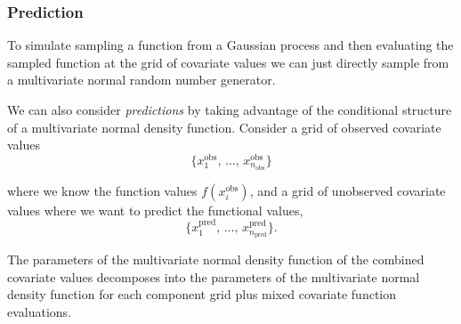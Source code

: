       \subsubsection{Prediction}

         \cite{Betancourt2020} To simulate sampling a function from a Gaussian process and then evaluating the sampled function at the grid of covariate values we can just directly sample from a multivariate normal random number generator.

         \vspace{1em}

         We can also consider \textit{predictions} by taking advantage of the conditional structure of a multivariate normal density function. Consider a grid of observed covariate values \[\{x_{1}^{\text{obs}}, \, \ldots, \, x_{n_{\text{obs}}}^{\text{obs}}\}\]

         where we know the function values \(f(x_{i}^{\text{obs}})\), and a grid of unobserved covariate values where we want to predict the functional values, \[\{x_{1}^{\text{pred}}, \, \ldots, \, x_{n_{\text{pred}}}^{\text{pred}}\}.\]

         The parameters of the multivariate normal density function of the combined covariate values decomposes into the parameters of the multivariate normal density function for each component grid plus mixed covariate function evaluations.

         \vspace{1em}

